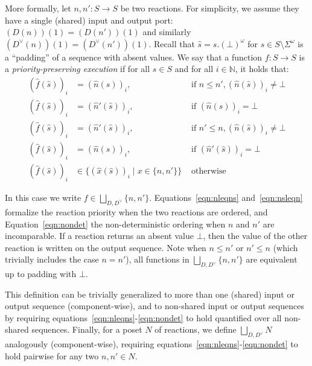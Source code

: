 More formally, let $n, n' : S \rightarrow S$ be two reactions.
For simplicity, we assume they have a single (shared) input and output port: $(D(n))(1) = (D(n'))(1)$ and similarly $(D^\vee(n))(1) = (D^\vee(n'))(1)$.
Recall that $\hat s = s.(\bot)^\omega$ for $s \in S \setminus \Sigma^\omega$ is a ``padding'' of a sequence with absent values.
We say that a function $f : S \rightarrow S$ is a \emph{priority-preserving execution} if for all $s \in S$ and for all $i \in \mathbb{N}$, it holds that:
\begin{align}
\label{eqn:nleqns} (\hat f(\hat s))_i &  =  (\hat n(\hat s))_i, & \text{ if } n \leq n', (\hat n(\hat s))_i \neq \bot \\
\label{eqn:nleqnsbot} (\hat f(\hat s))_i &  =  (\hat n'(\hat s))_i, & \text{ if } (\hat n(\hat s))_i = \bot \\
\label{eqn:nsleqn} (\hat f(\hat s))_i &  =  (\hat n'(\hat s))_i, & \text{ if } n' \leq n, (\hat n(\hat s))_i \neq \bot \\
\label{eqn:nsleqnbot} (\hat f(\hat s))_i &  =  (\hat n(\hat s))_i, & \text{ if } (\hat n'(\hat s))_i = \bot \\
\label{eqn:nondet} (\hat f(\hat s))_i &  \in \{ (\hat x(\hat s))_i \mid x \in \{n,n'\} \} & \text{ otherwise }
\end{align}

In this case we write $f \in \bigsqcup_{D,D^\vee} \{n, n'\}$.
Equations~\ref{eqn:nleqns} and~\ref{eqn:nsleqn} formalize the reaction priority when the two reactions are ordered, and Equation~\ref{eqn:nondet} the non-deterministic ordering when $n$ and $n'$ are incomparable.
If a reaction returns an absent value $\bot$, then the value of the other reaction is written on the output sequence.
Note when $n \leq n'$ or $n' \leq n$ (which trivially includes the case $n = n'$), all functions in $\bigsqcup_{D,D^\vee} \{n,n'\}$ are equivalent up to padding with $\bot$. 

This definition can be trivially generalized to more than one (shared) input or output sequence (component-wise), and to non-shared input or output sequences by requiring equations~\ref{eqn:nleqns}-\ref{eqn:nondet} to hold quantified over all non-shared sequences.
Finally, for a \ac{poset} $N$ of reactions, we define $\bigsqcup_{D,D^\vee} N$ analogously (component-wise), requiring equations~\ref{eqn:nleqns}-\ref{eqn:nondet} to hold pairwise for any two $n, n' \in N$.

